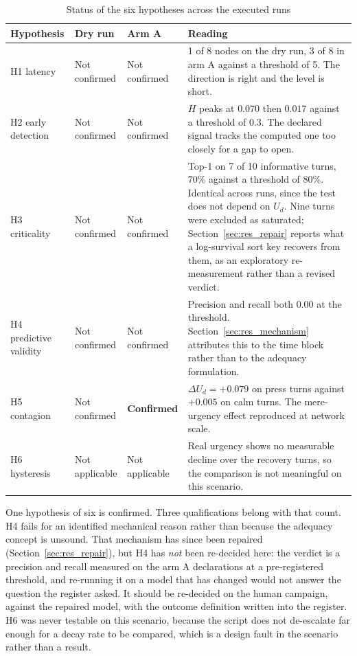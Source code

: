 \begin{table}[htbp]
\centering
\caption{Status of the six hypotheses across the executed runs}
\label{tab:hypothesis_status}
\small
\begin{tabularx}{\linewidth}{>{\raggedright\arraybackslash}p{2.5cm} >{\raggedright\arraybackslash}p{2.1cm} >{\raggedright\arraybackslash}p{2.1cm} X}
\toprule
\textbf{Hypothesis} & \textbf{Dry run} & \textbf{Arm A} & \textbf{Reading} \\
\midrule
H1 latency & Not confirmed & Not confirmed & 1 of 8 nodes on the dry run, 3 of 8 in arm A
against a threshold of 5. The direction is right and the level is short. \\
\midrule
H2 early detection & Not confirmed & Not confirmed & $H$ peaks at $0.070$ then $0.017$
against a threshold of $0.3$. The declared signal tracks the computed one too closely for a
gap to open. \\
\midrule
H3 criticality & Not confirmed & Not confirmed & Top-1 on 7 of 10 informative turns, $70\%$
against a threshold of $80\%$. Identical across runs, since the test does not depend on
$U_d$. Nine turns were excluded as saturated; Section~\ref{sec:res_repair} reports what a
log-survival sort key recovers from them, as an exploratory re-measurement rather than a
revised verdict. \\
\midrule
H4 predictive validity & Not confirmed & Not confirmed & Precision and recall both $0.00$ at
the threshold. Section~\ref{sec:res_mechanism} attributes this to the time block rather than
to the adequacy formulation. \\
\midrule
H5 contagion & Not confirmed & \textbf{Confirmed} & $\Delta U_d = +0.079$ on press turns
against $+0.005$ on calm turns. The mere-urgency effect reproduced at network scale. \\
\midrule
H6 hysteresis & Not applicable & Not applicable & Real urgency shows no measurable decline
over the recovery turns, so the comparison is not meaningful on this scenario. \\
\bottomrule
\end{tabularx}
\end{table}

One hypothesis of six is confirmed. Three qualifications belong with that count. H4 fails for
an identified mechanical reason rather than because the adequacy concept is unsound. That
mechanism has since been repaired (Section~\ref{sec:res_repair}), but H4 has \emph{not} been
re-decided here: the verdict is a precision and recall measured on the arm A declarations at
a pre-registered threshold, and re-running it on a model that has changed would not answer
the question the register asked. It should be re-decided on the human campaign, against the
repaired model, with the outcome definition written into the register. H6 was never testable
on this scenario, because the script does not de-escalate far enough for a decay rate to be
compared, which is a design fault in the scenario rather than a result.

